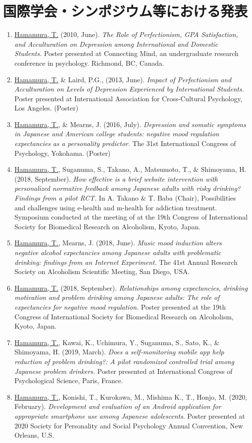 \documentclass{article}
\begin{document}
\section{国際学会・シンポジウム等における発表}
\begin{enumerate}
	\item \underline{Hamamura, T.} (2010, June). \textit{The Role of Perfectionism, GPA Satisfaction, and Acculturation on Depression among International and Domestic Students.} Poster presented at Connecting Mind, an undergraduate research conference in psychology. Richmond, BC, Canada.
	\item \underline{Hamamura, T.} \& Laird, P.G., (2013, June). \textit{Impact of Perfectionism and Acculturation on Levels of Depression Experienced by International Students.} Poster presented at International Association for Cross-Cultural Psychology, Los Angeles. (Poster)
	\item \underline{Hamamura, T.}, \& Mearns, J. (2016, July). \textit{Depression and somatic symptoms in Japanese and American college students: negative mood regulation expectancies as a personality predictor.} The 31st International Congress of Psychology, Yokohama. (Poster)
	\item \underline{Hamamura, T.}, Suganuma, S., Takano, A., Matsumoto, T., \& Shimoyama, H. (2018, September). \textit{How effective is a brief website intervention with personalized normative feedback among Japanese adults with risky drinking? Findings from a pilot RCT.} In A. Takano \& T. Baba (Chair), Possibilities and challenges using e-health and m-health for addiction treatment. Symposium conducted at the meeting of at the 19th Congress of International Society for Biomedical Research on Alcoholism, Kyoto, Japan.
	\item \underline{Hamamura, T.}, Mearns, J. (2018, June). \textit{Music mood induction alters negative alcohol expectancies among Japanese adults with problematic drinking: findings from an Internet Experiment.} The 41st Annual Research Society on Alcoholism Scientific Meeting, San Diego, USA.
	\item \underline{Hamamura, T.} (2018, September). \textit{Relationships among expectancies, drinking motivation and problem drinking among Japanese adults: The role of expectancies for negative mood regulation.} Poster presented at the 19th Congress of International Society for Biomedical Research on Alcoholism, Kyoto, Japan.
	\item \underline{Hamamura, T.}, Kawai, K., Uchimura, Y., Suganuma, S., Sato, K., \& Shimoyama, H. (2019, March). \textit{Does a self-monitoring mobile app help reduction of problem drinking?: A pilot randomized controlled trial among Japanese problem drinkers.} Poster presented at International Congress of Psychological Science, Paris, France.
	\item \underline{Hamamura, T.}, Konishi, T., Kurokawa, M., Mishima K., T., Honjo, M. (2020, February). \textit{Development and evaluation of an Android application for appropriate smartphone use among Japanese adolescents.} Poster presented at 2020 Society for Personality and Social Psychology Annual Convention, New Orleans, U.S.
\end{enumerate}
\end{document}
